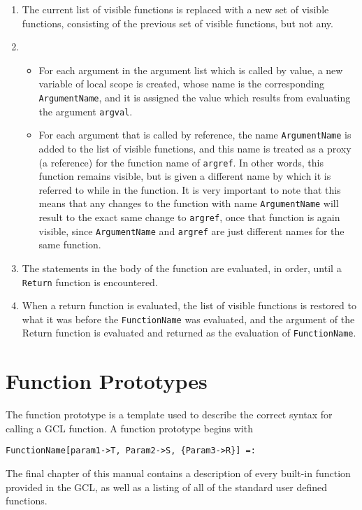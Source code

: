 \begin{enumerate}
\item
The current list of visible functions is 
replaced with a new set of visible functions, consisting of the
previous set of visible functions, but not any.
 
\item
\begin{itemize}
\item
For each argument in the argument list which is called by
value, a new variable of local scope is created, whose name is the
corresponding \verb+ArgumentName+, and it is assigned the value
which results from evaluating the argument \verb+argval+.  
\item
For each
argument that is called by reference, the name \verb+ArgumentName+ is
added to the list of visible functions, and this name is treated as a
proxy (a reference) for the function name of \verb+argref+.  In other
words, this function remains visible, but is given a different name by
which it is referred to while in the function.  It is very important
to note that this means that any changes to the function with name
\verb+ArgumentName+ will result to the exact same change to
\verb+argref+, once that function is again visible, since
\verb+ArgumentName+ and \verb+argref+ are just different names for the
same function.
\end{itemize}

\item
The statements in the body of the function are evaluated, in
order, until a \verb+Return+ function is encountered.  

\item
When a return function is evaluated, the list of visible
functions is restored to what it was before the \verb+FunctionName+
was evaluated, and the argument of the Return function is evaluated
and returned as the evaluation of \verb+FunctionName+. 
\end{enumerate}

\section{Function Prototypes}

The function prototype is a template used to describe the correct
syntax for calling a GCL function.  A function prototype begins with 

\begin{verbatim}
FunctionName[param1->T, Param2->S, {Param3->R}] =: 
\end{verbatim}


The final chapter of this manual contains a description of every
built-in function provided in the GCL, as well as a listing of all of
the standard user defined functions.    

